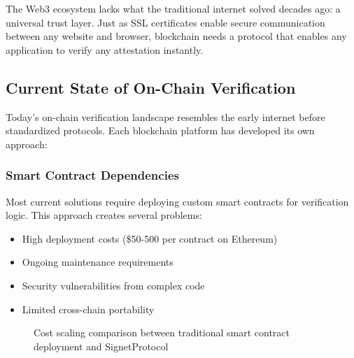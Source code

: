 \documentclass[11pt,a4paper]{article}
\begin{document}
The Web3 ecosystem lacks what the traditional internet solved decades ago: a universal trust layer. Just as SSL certificates enable secure communication between any website and browser, blockchain needs a protocol that enables any application to verify any \gls{attestation} instantly.

\subsection{Current State of On-Chain Verification}

Today's on-chain verification landscape resembles the early internet before standardized protocols. Each blockchain platform has developed its own approach:

\subsubsection{Smart Contract Dependencies}
Most current solutions require deploying custom smart contracts for verification logic. This approach creates several problems:
\begin{itemize}
    \item High deployment costs (\$50-500 per contract on Ethereum)
    \item Ongoing maintenance requirements 
    \item Security vulnerabilities from complex code
    \item Limited cross-chain portability
\end{itemize}

\begin{figure}[H]
\centering
{}
\caption{Cost scaling comparison between traditional smart contract deployment and SignetProtocol}
\label{fig:cost-comparison}
\end{figure}
\end{document}
